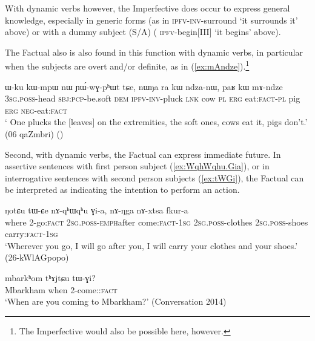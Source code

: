 With dynamic verbs however, the Imperfective does occur to express general knowledge, especially in generic forms (as in   \textsc{ipfv}-\textsc{inv}-surround  `it surrounds it' above)  or with a dummy subject (S/A) ( \textsc{ipfv}-begin[III] `it begins' above). 
 
The Factual also is also found in this function with dynamic verbs, in particular when the subjects are overt and/or definite, as in (\ref{ex:mAndze}).\footnote{The Imperfective would also be possible here, however. }

\begin{exe}
\ex \label{ex:mAndze}
\gll ɯ-ku kɯ-mpɯ nɯ ɲɯ́-wɣ-pʰɯt tɕe, nɯŋa ra kɯ ndza-nɯ, paʁ kɯ mɤ-ndze \\
\textsc{3sg}.\textsc{poss}-head \textsc{sbj}:\textsc{pcp}-be.soft \textsc{dem} \textsc{ipfv}-\textsc{inv}-pluck \textsc{lnk} cow \textsc{pl} \textsc{erg} eat:\textsc{fact}-\textsc{pl} pig \textsc{erg} \textsc{neg}-eat:\textsc{fact} \\
\glt ` One plucks the [leaves] on the extremities, the soft ones, cows eat it, pigs don't.' (06 qaZmbri)
()
\end{exe}
 
Second, with dynamic verbs, the Factual can express immediate future. In  assertive sentences with first person subject (\ref{ex:WqhWqhu.Gia}), or in interrogative sentences with second person subjects (\ref{ex:tWGi}), the Factual can be interpreted as indicating the intention to perform an action.

\begin{exe}
\ex \label{ex:WqhWqhu.Gia}
\gll ŋotɕu tɯ-ɕe nɤ-qʰɯ\redp{}qʰu ɣi-a, nɤ-ŋga nɤ-xtsa fkur-a \\
where 2-go:\textsc{fact} \textsc{2sg}.\textsc{poss}-\textsc{emph}\redp{}after come:\textsc{fact}-\textsc{1sg} \textsc{2sg}.\textsc{poss}-clothes  \textsc{2sg}.\textsc{poss}-shoes carry:\textsc{fact}-\textsc{1sg} \\
\glt `Wherever you go, I will go after you, I will carry your clothes and your shoes.' (26-kWlAGpopo)
\end{exe}

\begin{exe}
\ex \label{ex:tWGi}
\gll mbarkʰom tʰɤjtɕu tɯ-ɣi? \\
Mbarkham when 2-come::\textsc{fact} \\
\glt `When are you coming to Mbarkham?' (Conversation 2014)
\end{exe}

